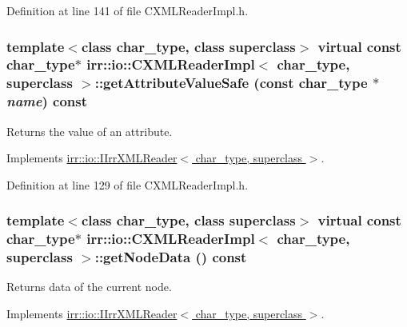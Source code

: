 Definition at line 141 of file CXMLReaderImpl.h.\hypertarget{classirr_1_1io_1_1_c_x_m_l_reader_impl_f8ff476656b98b9f491b453c8093b77b}{
\subsubsection[{getAttributeValueSafe}]{\setlength{\rightskip}{0pt plus 5cm}template$<$class char\_\-type, class superclass$>$ virtual const char\_\-type$\ast$ {\bf irr::io::CXMLReaderImpl}$<$ char\_\-type, {\bf superclass} $>$::getAttributeValueSafe (const char\_\-type $\ast$ {\em name}) const}}
\label{classirr_1_1io_1_1_c_x_m_l_reader_impl_f8ff476656b98b9f491b453c8093b77b}


Returns the value of an attribute. 



Implements \hyperlink{classirr_1_1io_1_1_i_irr_x_m_l_reader_7674852b2e24b2710b90aab10ef1fc22}{irr::io::IIrrXMLReader$<$ char\_\-type, superclass $>$}.

Definition at line 129 of file CXMLReaderImpl.h.\hypertarget{classirr_1_1io_1_1_c_x_m_l_reader_impl_c661ef32418a004c1ec3b6e02c9615df}{
\subsubsection[{getNodeData}]{\setlength{\rightskip}{0pt plus 5cm}template$<$class char\_\-type, class superclass$>$ virtual const char\_\-type$\ast$ {\bf irr::io::CXMLReaderImpl}$<$ char\_\-type, {\bf superclass} $>$::getNodeData () const}}
\label{classirr_1_1io_1_1_c_x_m_l_reader_impl_c661ef32418a004c1ec3b6e02c9615df}


Returns data of the current node. 



Implements \hyperlink{classirr_1_1io_1_1_i_irr_x_m_l_reader_ecbe0698e8f9acf88e27dd53da984210}{irr::io::IIrrXMLReader$<$ char\_\-type, superclass $>$}.

